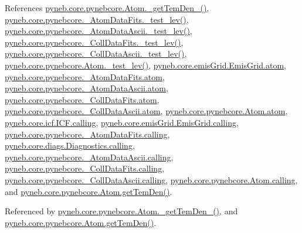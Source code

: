 References \hyperlink{pynebcore_8py_source_l01803}{pyneb.\+core.\+pynebcore.\+Atom.\+\_\+get\+Tem\+Den\+\_()}, \hyperlink{pynebcore_8py_source_l00171}{pyneb.\+core.\+pynebcore.\+\_\+\+Atom\+Data\+Fits.\+\_\+test\+\_\+lev()}, \hyperlink{pynebcore_8py_source_l00435}{pyneb.\+core.\+pynebcore.\+\_\+\+Atom\+Data\+Ascii.\+\_\+test\+\_\+lev()}, \hyperlink{pynebcore_8py_source_l00660}{pyneb.\+core.\+pynebcore.\+\_\+\+Coll\+Data\+Fits.\+\_\+test\+\_\+lev()}, \hyperlink{pynebcore_8py_source_l01026}{pyneb.\+core.\+pynebcore.\+\_\+\+Coll\+Data\+Ascii.\+\_\+test\+\_\+lev()}, \hyperlink{pynebcore_8py_source_l01459}{pyneb.\+core.\+pynebcore.\+Atom.\+\_\+test\+\_\+lev()}, \hyperlink{emis_grid_8py_source_l00048}{pyneb.\+core.\+emis\+Grid.\+Emis\+Grid.\+atom}, \hyperlink{pynebcore_8py_source_l00082}{pyneb.\+core.\+pynebcore.\+\_\+\+Atom\+Data\+Fits.\+atom}, \hyperlink{pynebcore_8py_source_l00303}{pyneb.\+core.\+pynebcore.\+\_\+\+Atom\+Data\+Ascii.\+atom}, \hyperlink{pynebcore_8py_source_l00559}{pyneb.\+core.\+pynebcore.\+\_\+\+Coll\+Data\+Fits.\+atom}, \hyperlink{pynebcore_8py_source_l00909}{pyneb.\+core.\+pynebcore.\+\_\+\+Coll\+Data\+Ascii.\+atom}, \hyperlink{pynebcore_8py_source_l01164}{pyneb.\+core.\+pynebcore.\+Atom.\+atom}, \hyperlink{icf_8py_source_l00016}{pyneb.\+core.\+icf.\+I\+C\+F.\+calling}, \hyperlink{emis_grid_8py_source_l00041}{pyneb.\+core.\+emis\+Grid.\+Emis\+Grid.\+calling}, \hyperlink{pynebcore_8py_source_l00090}{pyneb.\+core.\+pynebcore.\+\_\+\+Atom\+Data\+Fits.\+calling}, \hyperlink{diags_8py_source_l00169}{pyneb.\+core.\+diags.\+Diagnostics.\+calling}, \hyperlink{pynebcore_8py_source_l00311}{pyneb.\+core.\+pynebcore.\+\_\+\+Atom\+Data\+Ascii.\+calling}, \hyperlink{pynebcore_8py_source_l00568}{pyneb.\+core.\+pynebcore.\+\_\+\+Coll\+Data\+Fits.\+calling}, \hyperlink{pynebcore_8py_source_l00918}{pyneb.\+core.\+pynebcore.\+\_\+\+Coll\+Data\+Ascii.\+calling}, \hyperlink{pynebcore_8py_source_l01175}{pyneb.\+core.\+pynebcore.\+Atom.\+calling}, and \hyperlink{pynebcore_8py_source_l02060}{pyneb.\+core.\+pynebcore.\+Atom.\+get\+Tem\+Den()}.



Referenced by \hyperlink{pynebcore_8py_source_l01803}{pyneb.\+core.\+pynebcore.\+Atom.\+\_\+get\+Tem\+Den\+\_()}, and \hyperlink{pynebcore_8py_source_l02060}{pyneb.\+core.\+pynebcore.\+Atom.\+get\+Tem\+Den()}.



